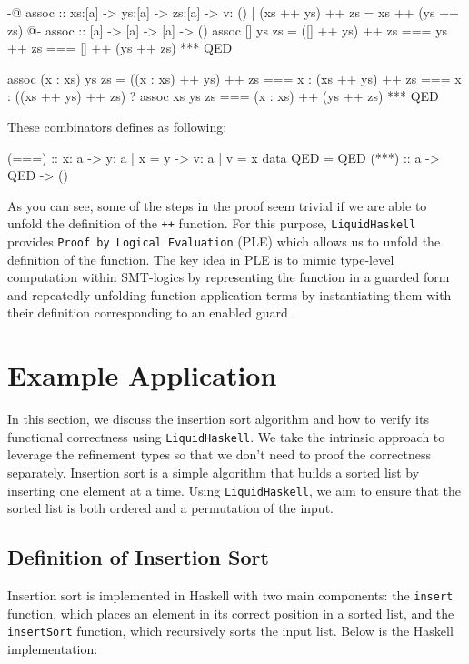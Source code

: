 \documentclass[]{rptuseminar}
\begin{document}
\begin{haskell}
{-@ assoc :: xs:[a] -> ys:[a] -> zs:[a] 
  -> { v: () | (xs ++ ys) ++ zs = xs ++ (ys ++ zs) } @-}
assoc :: [a] -> [a] -> [a] -> ()
assoc [] ys zs =
  ([] ++ ys)
    ++ zs
    === ys
    ++ zs
    === []
    ++ (ys ++ zs)
    *** QED

assoc (x : xs) ys zs =
  ((x : xs) ++ ys)
    ++ zs
    ===  x : (xs ++ ys) ++ zs
    === x
    : ((xs ++ ys) ++ zs)
      ? assoc xs ys zs
      === (x : xs)
      ++ (ys ++ zs)
      *** QED
\end{haskell}

These combinators defines as following:
\begin{haskell}
  (===) :: x: a -> y: { a | x = y }  -> { v: a | v = x }
  data QED = QED
  (***) :: a -> QED -> ()
\end{haskell}

As you can see, some of the steps in the proof seem trivial if we are able to unfold the definition of the \texttt{++} function.
For this purpose, \texttt{LiquidHaskell} provides \texttt{Proof by Logical Evaluation} (PLE) which allows us to unfold the definition of the function.
The key idea in PLE is to mimic type-level computation within SMT-logics by representing the function in a guarded form and repeatedly unfolding function
application terms by instantiating them with their definition corresponding to an enabled guard \cite{vazou_refinement_2018}.

\section{Example Application}

In this section, we discuss the insertion sort algorithm and how to verify its functional correctness using \texttt{LiquidHaskell}.
We take the intrinsic approach to leverage the refinement types so that we don't need to proof the correctness separately.
Insertion sort is a simple algorithm that builds a sorted list by inserting one element at a time.
Using \texttt{LiquidHaskell}, we aim to ensure that the sorted list is both ordered and a permutation of the input.

\subsection{Definition of Insertion Sort}

Insertion sort is implemented in Haskell with two main components: 
the \texttt{insert} function, which places an element in its correct position in a sorted list, 
and the \texttt{insertSort} function, which recursively sorts the input list. Below is the Haskell implementation:
\end{document}
